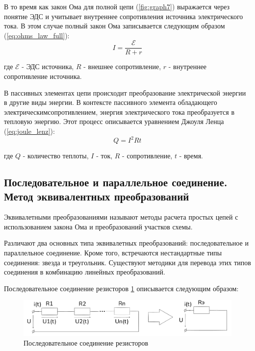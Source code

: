 В то время как закон Ома для полной цепи (\ref{fig:graph7}) выражается через понятие ЭДС и учитывает внутреннее сопротивления источника электрического тока. В этом случае полный закон Ома записывается следующим образом (\ref{eq:ohms_law_full}):
\begin{equation}
    I = \frac{\mathcal{E}}{R + r}
    \label{eq:ohms_law_full}
\end{equation}

где $\mathcal{E}$ - ЭДС источника, $R$ - внешнее сопротивление, $r$ - внутреннее сопротивление источника.

В пассивных элементах цепи происходит преобразование электрической энергии в другие виды энергии. В контексте пассивного элемента обладающего электрическимсопротивлением, энергия электрического тока преобразуется в тепловую энергию. Этот процесс описывается уравнением Джоуля Ленца (\ref{eq:joule_lenz}):
\begin{equation}
    Q = I^2 R t
    \label{eq:joule_lenz}
\end{equation}

где $Q$ - количество теплоты, $I$ - ток, $R$ - сопротивление, $t$ - время.

\subsection{Последовательное и параллельное соединение. Метод эквивалентных преобразований}
Эквивалетными преобразованиями называют методы расчета простых цепей с использованием закона Ома и преобразований участков схемы. 

Различают два основных типа эквивалетных преобразований: последовательное и параллельное соединение. Кроме того, встречаются нестандартные типы соединения: звезда и треугольник. Существуют методики для перевода этих типов соединения в комбинацию линейных преобразований.

Последовательное соединение резисторов \ref{fig:graph8} описывается следующим образом:

\begin{figure}[H]
    \centering
    \includegraphics[width=1\textwidth]{images/image_1_resistor_merge.png}
    \caption{Последовательное соединение резисторов}
    \label{fig:graph8}
\end{figure}

